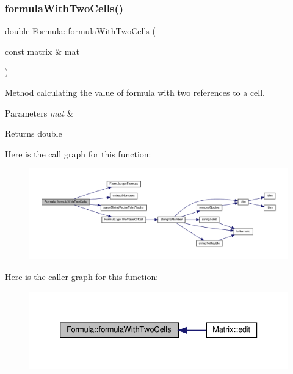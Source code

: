 \subsubsection{\texorpdfstring{formula\+With\+Two\+Cells()}{formulaWithTwoCells()}}
{\footnotesize\ttfamily double Formula\+::formula\+With\+Two\+Cells (\begin{DoxyParamCaption}\item[{const matrix \&}]{mat }\end{DoxyParamCaption})}

Method calculating the value of formula with two references to a cell. 
\begin{DoxyParams}{Parameters}
{\em mat} & \\
\hline
\end{DoxyParams}
\begin{DoxyReturn}{Returns}
double 
\end{DoxyReturn}
Here is the call graph for this function\+:\nopagebreak
\begin{figure}[H]
\begin{center}
\leavevmode
\includegraphics[width=350pt]{class_formula_a518bc97bd50f1cc5573be7d3f8cb6253_cgraph}
\end{center}
\end{figure}
Here is the caller graph for this function\+:\nopagebreak
\begin{figure}[H]
\begin{center}
\leavevmode
\includegraphics[width=333pt]{class_formula_a518bc97bd50f1cc5573be7d3f8cb6253_icgraph}
\end{center}
\end{figure}
\mbox{\label{class_formula_a2159ffdb34d80f2bee422eee89fc871a}} 
